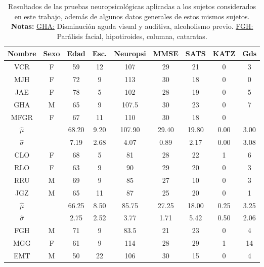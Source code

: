 \begin{table}
\centering
\begin{small}
\begin{tabular}{c|ccc|ccccc}
\textbf{Nombre} & \textbf{Sexo} & \textbf{Edad} & \textbf{Esc.} & \textbf{Neuropsi} & \textbf{MMSE} & \textbf{SATS} & \textbf{KATZ} & \textbf{Gds} \\
\hline 
\hline 
VCR    & F    & 59   & 12   & 107      & 29   & 21   & 0    & 3 \\
MJH    & F    & 72   & 9    & 113      & 30   & 18   & 0    & 0 \\
JAE    & F    & 78   & 5    & 102      & 28   & 19   & 0    & 5 \\
GHA    & M    & 65   & 9    & 107.5    & 30   & 23   & 0    & 7 \\
MFGR   & F    & 67   & 11   & 110      & 30   & 18   & 0    &   \\
\hline 
$\widehat{\mu}$ & 
              & 68.20& 9.20 & 107.90   & 29.40& 19.80& 0.00 & 3.00\\
$\widehat{\sigma}$ & 
              & 7.19 & 2.68 & 4.07     & 0.89 & 2.17 & 0.00 & 3.08\\
\hline 
\hline 
CLO    & F    & 68   & 5    & 81       & 28   & 22   & 1    & 6 \\
RLO    & F    & 63   & 9    & 90       & 29   & 20   & 0    & 3 \\
RRU    & M    & 69   & 9    & 85       & 27   & 10   & 0    & 3 \\
JGZ    & M    & 65   & 11   & 87       & 25   & 20   & 0    & 1 \\
\hline 
$\widehat{\mu}$ & 
              & 66.25& 8.50 & 85.75   & 27.25& 18.00& 0.25 & 3.25\\
$\widehat{\sigma}$ & 
              & 2.75 & 2.52 & 3.77    & 1.71 & 5.42 & 0.50 & 2.06\\
\hline 
\hline 
FGH    & M    & 71   & 9    & 83.5     & 21   & 23   & 0    & 4  \\
MGG    & F    & 61   & 9    & 114      & 28   & 29   & 1    & 14 \\
EMT    & M    & 50   & 22   & 106      & 30   & 15   & 0    & 4  \\
\end{tabular} 
\end{small}
\label{tab_sujetos}
\caption{Resultados de las pruebas neuropsicol\'ogicas aplicadas a los sujetos considerados
en este trabajo, adem\'as de algunos datos generales de estos mismos sujetos. \textbf{Notas:}
\underline{GHA:} Disminuci\'on aguda visual y auditiva, alcoholismo previo. 
\underline{FGH:} Par\'alisis facial, hipotiroides, columna, cataratas.}
\end{table}

